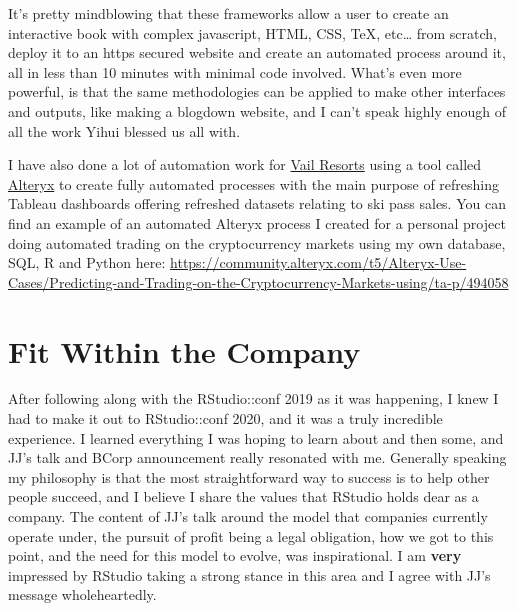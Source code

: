 \documentclass[
]{book}
\begin{document}
It's pretty mindblowing that these frameworks allow a user to create an interactive book with complex javascript, HTML, CSS, TeX, etc\ldots{} from scratch, deploy it to an https secured website and create an automated process around it, all in less than 10 minutes with minimal code involved. What's even more powerful, is that the same methodologies can be applied to make other interfaces and outputs, like making a blogdown website, and I can't speak highly enough of all the work Yihui blessed us all with.

I have also done a lot of automation work for \href{https://www.google.com/search?q=vail+resorts+stock}{Vail Resorts} using a tool called \href{https://www.alteryx.com/}{Alteryx} to create fully automated processes with the main purpose of refreshing Tableau dashboards offering refreshed datasets relating to ski pass sales. You can find an example of an automated Alteryx process I created for a personal project doing automated trading on the cryptocurrency markets using my own database, SQL, R and Python here: \url{https://community.alteryx.com/t5/Alteryx-Use-Cases/Predicting-and-Trading-on-the-Cryptocurrency-Markets-using/ta-p/494058}

\hypertarget{rstudio}{%
\section{Fit Within the Company}\label{rstudio}}

After following along with the RStudio::conf 2019 as it was happening, I knew I had to make it out to RStudio::conf 2020, and it was a truly incredible experience. I learned everything I was hoping to learn about and then some, and JJ's talk and BCorp announcement really resonated with me. Generally speaking my philosophy is that the most straightforward way to success is to help other people succeed, and I believe I share the values that RStudio holds dear as a company. The content of JJ's talk around the model that companies currently operate under, the pursuit of profit being a legal obligation, how we got to this point, and the need for this model to evolve, was inspirational. I am \textbf{very} impressed by RStudio taking a strong stance in this area and I agree with JJ's message wholeheartedly.
\end{document}
